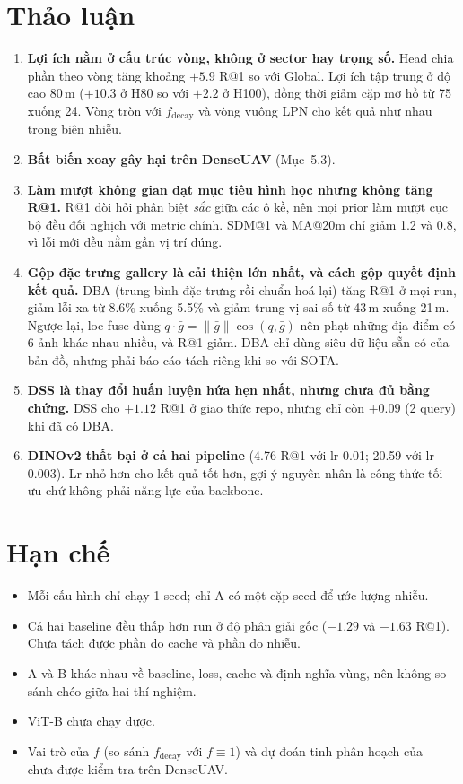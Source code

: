 \documentclass[11pt,a4paper]{article}
\begin{document}
\section{Thảo luận}
\begin{enumerate}[label=(\arabic*),leftmargin=2em]
\item \textbf{Lợi ích nằm ở cấu trúc vòng, không ở sector hay trọng số.} Head chia phần theo vòng tăng khoảng $+5.9$ R@1 so với Global. Lợi ích tập trung ở độ cao 80\,m ($+10.3$ ở H80 so với $+2.2$ ở H100), đồng thời giảm cặp mơ hồ từ 75 xuống 24. Vòng tròn với $f_{\mathrm{decay}}$ và vòng vuông LPN cho kết quả như nhau trong biên nhiễu.
\item \textbf{Bất biến xoay gây hại trên DenseUAV} (Mục~5.3).
\item \textbf{Làm mượt không gian đạt mục tiêu hình học nhưng không tăng R@1.} R@1 đòi hỏi phân biệt \emph{sắc} giữa các ô kề, nên mọi prior làm mượt cục bộ đều đối nghịch với metric chính. SDM@1 và MA@20m chỉ giảm 1.2 và 0.8, vì lỗi mới đều nằm gần vị trí đúng.
\item \textbf{Gộp đặc trưng gallery là cải thiện lớn nhất, và cách gộp quyết định kết quả.} DBA (trung bình đặc trưng rồi chuẩn hoá lại) tăng R@1 ở mọi run, giảm lỗi xa từ 8.6\% xuống 5.5\% và giảm trung vị sai số từ 43\,m xuống 21\,m. Ngược lại, loc-fuse dùng $q\cdot\bar g=\lVert\bar g\rVert\cos(q,\bar g)$ nên phạt những địa điểm có 6 ảnh khác nhau nhiều, và R@1 giảm. DBA chỉ dùng siêu dữ liệu sẵn có của bản đồ, nhưng phải báo cáo tách riêng khi so với SOTA.
\item \textbf{DSS là thay đổi huấn luyện hứa hẹn nhất, nhưng chưa đủ bằng chứng.} DSS cho $+1.12$ R@1 ở giao thức repo, nhưng chỉ còn $+0.09$ (2 query) khi đã có DBA.
\item \textbf{DINOv2 thất bại ở cả hai pipeline} (4.76 R@1 với lr 0.01; 20.59 với lr 0.003). Lr nhỏ hơn cho kết quả tốt hơn, gợi ý nguyên nhân là công thức tối ưu chứ không phải năng lực của backbone.
\end{enumerate}

\section{Hạn chế}
\begin{itemize}
\item Mỗi cấu hình chỉ chạy 1 seed; chỉ A có một cặp seed để ước lượng nhiễu.
\item Cả hai baseline đều thấp hơn run ở độ phân giải gốc ($-1.29$ và $-1.63$ R@1). Chưa tách được phần do cache và phần do nhiễu.
\item A và B khác nhau về baseline, loss, cache và định nghĩa vùng, nên không so sánh chéo giữa hai thí nghiệm.
\item ViT-B chưa chạy được.
\item Vai trò của $f$ (so sánh $f_{\mathrm{decay}}$ với $f\equiv1$) và dự đoán tinh phân hoạch của~\cite{huu2026} chưa được kiểm tra trên DenseUAV.
\end{itemize}
\end{document}
